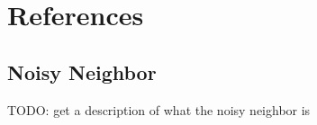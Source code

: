\section{References}
\label{sec:ref}

\subsection{Noisy Neighbor}
\label{sec:ref:noisy-neighbour}
TODO: get a description of what the noisy neighbor is
